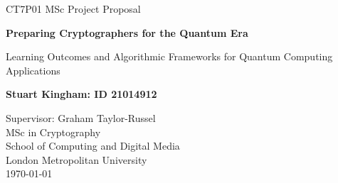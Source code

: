 \documentclass[11pt,a4paper]{article}
\author{\myauthor: ID \myid}
\title{\mytitle}
\date{\today}
\newcommand{\mytitle}{Preparing Cryptographers for the Quantum Era}
\newcommand{\mysubtitle}{Learning Outcomes and Algorithmic Frameworks for Quantum Computing Applications}
\newcommand{\myauthor}{Stuart Kingham}
\newcommand{\myid}{21014912}
\begin{document}
\doublespacing



\begin{titlepage}
  \vspace*{\fill}
  \begin{center}
       \vspace*{1cm}

       {\LARGE CT7P01 MSc Project Proposal}

       \vspace*{1cm}
       {\large \textbf{\mytitle}}
       
       \vspace{0.2cm}
       {\large \mysubtitle}
            

       \vfill

       \textbf{\myauthor : ID \myid}

       \vfill
                        
       \vspace{0.8cm}
     

       Supervisor: Graham Taylor-Russel \\
       MSc in Cryptography \\
       School of Computing and Digital Media\\
       London Metropolitan University\\
       \today
            
  \end{center}
  \vspace*{\fill}
\end{titlepage}


\pagebreak

\newpage

\singlespacing 
\tableofcontents
\listoffigures
\doublespacing

\newpage
\end{document}
